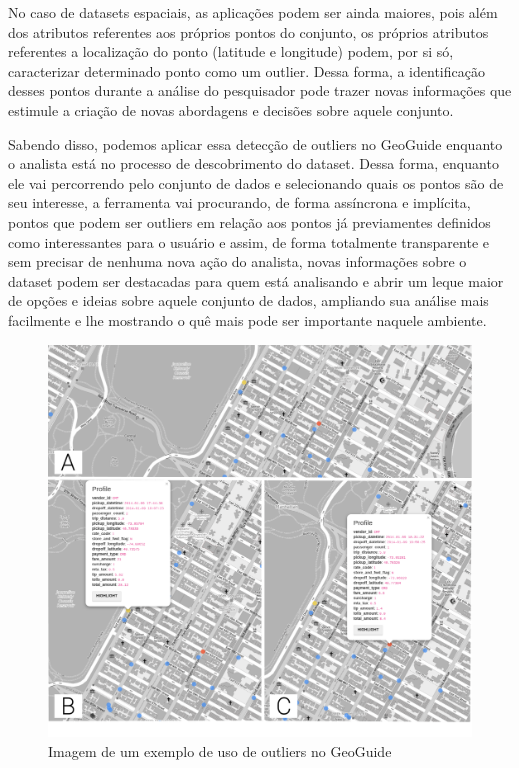 No caso de datasets espaciais, as aplicações podem ser ainda maiores, pois além dos atributos referentes aos próprios pontos do conjunto, os próprios atributos referentes a localização do ponto (latitude e longitude) podem, por si só, caracterizar determinado ponto como um outlier. Dessa forma, a identificação desses pontos durante a análise do pesquisador pode trazer novas informações que estimule a criação de novas abordagens e decisões sobre aquele conjunto.

Sabendo disso, podemos aplicar essa detecção de outliers no GeoGuide enquanto o analista está no processo de descobrimento do dataset. Dessa forma, enquanto ele vai percorrendo pelo conjunto de dados e selecionando quais os pontos são de seu interesse, a ferramenta vai procurando, de forma assíncrona e implícita, pontos que podem ser outliers em relação aos pontos já previamentes definidos como interessantes para o usuário e assim, de forma totalmente transparente e sem precisar de nenhuma nova ação do analista, novas informações sobre o dataset podem ser destacadas para quem está analisando e abrir um leque maior de opções e ideias sobre aquele conjunto de dados, ampliando sua análise mais facilmente e lhe mostrando o quê mais pode ser importante naquele ambiente.

\begin{figure}[t]
	\centering
	\includegraphics[width=\textwidth]{images/outliers-geoguide.png}
	\caption{Imagem de um exemplo de uso de outliers no GeoGuide}
	\label{fig:outliers-geoguide}
	\vspace{-10pt}
\end{figure}

